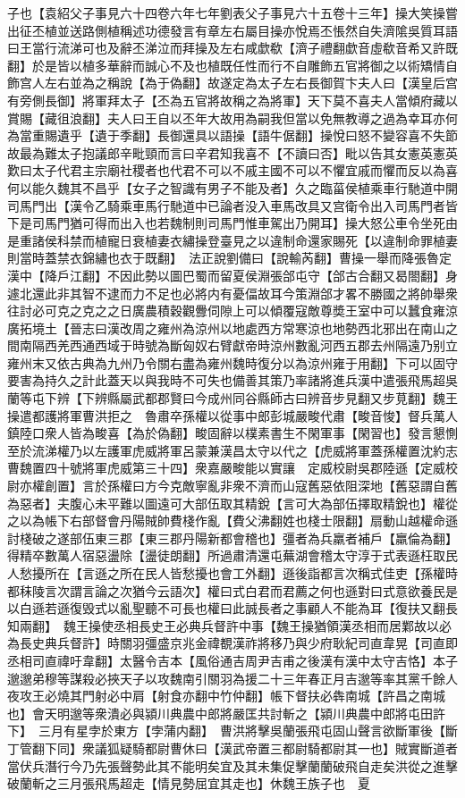 子也【袁紹父子事見六十四卷六年七年劉表父子事見六十五卷十三年】操大笑操嘗出征丕植並送路側植稱述功德發言有章左右屬目操亦悅焉丕悵然自失濟隂吳質耳語曰王當行流涕可也及辭丕涕泣而拜操及左右咸歔欷【濟子禮翻歔音虛欷音希又許既翻】於是皆以植多華辭而誠心不及也植既任性而行不自雕飾五官將御之以術矯情自飾宫人左右並為之稱說【為于偽翻】故遂定為太子左右長御賀卞夫人曰【漢皇后宫有旁側長御】將軍拜太子【丕為五官將故稱之為將軍】天下莫不喜夫人當傾府藏以賞賜【藏徂浪翻】夫人曰王自以丕年大故用為嗣我但當以免無教導之過為幸耳亦何為當重賜遺乎【遺于季翻】長御還具以語操【語牛倨翻】操悅曰怒不變容喜不失節故最為難太子抱議郎辛毗頸而言曰辛君知我喜不【不讀曰否】毗以告其女憲英憲英歎曰太子代君主宗廟社稷者也代君不可以不戚主國不可以不懼宜戚而懼而反以為喜何以能久魏其不昌乎【女子之智識有男子不能及者】久之臨菑侯植乘車行馳道中開司馬門出【漢令乙騎乘車馬行馳道中已論者没入車馬改具又宫衛令出入司馬門者皆下是司馬門猶可得而出入也若魏制則司馬門惟車駕出乃開耳】操大怒公車令坐死由是重諸侯科禁而植寵日衰植妻衣繡操登臺見之以違制命還家賜死【以違制命罪植妻則當時蓋禁衣錦繡也衣于既翻】　法正說劉備曰【說輸芮翻】曹操一舉而降張魯定漢中【降戶江翻】不因此勢以圖巴蜀而留夏侯淵張郃屯守【郃古合翻又曷閤翻】身遽北還此非其智不逮而力不足也必將内有憂偪故耳今策淵郃才畧不勝國之將帥舉衆往討必可克之克之之日廣農積穀觀釁伺隙上可以傾覆寇敵尊奬王室中可以蠶食雍涼廣拓境土【晉志曰漢改周之雍州為涼州以地處西方常寒涼也地勢西北邪出在南山之間南隔西羌西通西域于時號為斷匈奴右臂獻帝時涼州數亂河西五郡去州隔遠乃别立雍州末又依古典為九州乃令關右盡為雍州魏時復分以為涼州雍于用翻】下可以固守要害為持久之計此蓋天以與我時不可失也備善其策乃率諸將進兵漢中遣張飛馬超吳蘭等屯下辨【下辨縣屬武都郡賢曰今成州同谷縣師古曰辨音步見翻又步莧翻】魏王操遣都護將軍曹洪拒之　魯肅卒孫權以從事中郎彭城嚴畯代肅【畯音悛】督兵萬人鎮陸口衆人皆為畯喜【為於偽翻】畯固辭以樸素書生不閑軍事【閑習也】發言懇惻至於流涕權乃以左護軍虎威將軍呂蒙兼漢昌太守以代之【虎威將軍蓋孫權置沈約志曹魏置四十號將軍虎威第三十四】衆嘉嚴畯能以實讓　定威校尉吳郡陸遜【定威校尉亦權創置】言於孫權曰方今克敵寧亂非衆不濟而山寇舊惡依阻深地【舊惡謂自舊為惡者】夫腹心未平難以圖遠可大部伍取其精銳【言可大為部伍擇取精銳也】權從之以為帳下右部督會丹陽賊帥費棧作亂【費父沸翻姓也棧士限翻】扇動山越權命遜討棧破之遂部伍東三郡【東三郡丹陽新都會稽也】彊者為兵羸者補戶【羸倫為翻】得精卒數萬人宿惡盪除【盪徒朗翻】所過肅清還屯蕪湖會稽太守淳于式表遜枉取民人愁擾所在【言遜之所在民人皆愁擾也會工外翻】遜後詣都言次稱式佳吏【孫權時都秣陵言次謂言論之次猶今云語次】權曰式白君而君薦之何也遜對曰式意欲養民是以白遜若遜復毁式以亂聖聽不可長也權曰此誠長者之事顧人不能為耳【復扶又翻長知兩翻】　魏王操使丞相長史王必典兵督許中事【魏王操猶領漢丞相而居鄴故以必為長史典兵督許】時關羽彊盛京兆金禕覩漢祚將移乃與少府耿紀司直韋晃【司直即丞相司直禕吁韋翻】太醫令吉本【風俗通吉周尹吉甫之後漢有漢中太守吉恪】本子邈邈弟穆等謀殺必挾天子以攻魏南引關羽為援二十三年春正月吉邈等率其黨千餘人夜攻王必燒其門射必中肩【射食亦翻中竹仲翻】帳下督扶必犇南城【許昌之南城也】會天明邈等衆潰必與潁川典農中郎將嚴匡共討斬之【潁川典農中郎將屯田許下】　三月有星孛於東方【孛蒲内翻】　曹洪將擊吳蘭張飛屯固山聲言欲斷軍後【斷丁管翻下同】衆議狐疑騎都尉曹休曰【漢武帝置三都尉騎都尉其一也】賊實斷道者當伏兵潛行今乃先張聲勢此其不能明矣宜及其未集促擊蘭蘭破飛自走矣洪從之進擊破蘭斬之三月張飛馬超走【情見勢屈宜其走也】休魏王族子也　夏